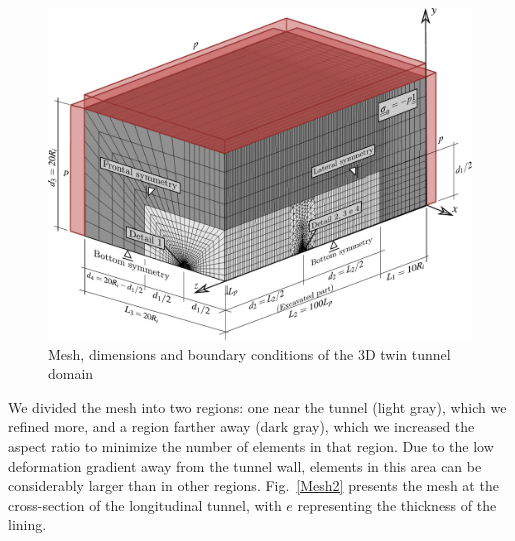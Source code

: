 \documentclass[a4paper,fleqn]{cas-sc}
\begin{document}
\begin{figure}[h!]
	\centering
	\includegraphics[scale=0.5]{Mesh1.pdf}
	\caption{Mesh, dimensions and boundary conditions of the 3D twin tunnel domain}
	\label{Mesh1}
\end{figure}

We divided the mesh into two regions: one near the tunnel (light gray), which we refined more, and a region farther away (dark gray), which we increased the aspect ratio to minimize the number of elements in that region. Due to the low deformation gradient away from the tunnel wall, elements in this area can be considerably larger than in other regions. Fig.~\ref{Mesh2} presents the mesh at the cross-section of the longitudinal tunnel, with $e$ representing the thickness of the lining.
\end{document}
